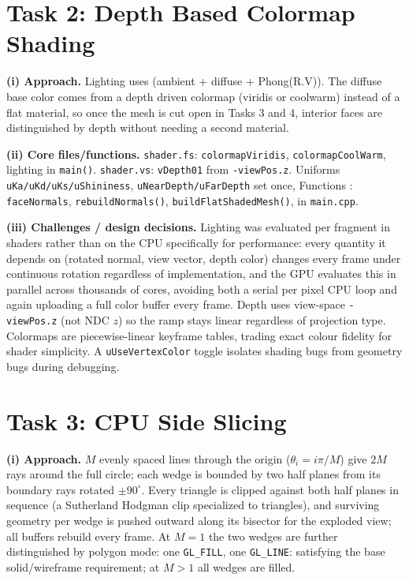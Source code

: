 \documentclass[10pt]{article}
\begin{document}
\section{Task 2: Depth Based Colormap Shading}
\textbf{(i) Approach.} Lighting uses 
(ambient + diffuse + Phong(R.V)). The 
diffuse base color comes from a depth driven colormap 
(viridis or coolwarm) instead of a flat material, so 
once the mesh is cut open in Tasks 3 and 4, interior faces 
are distinguished by depth without needing a second material.

\textbf{(ii) Core files/functions.} \texttt{shader.fs}: 
\texttt{colormapViridis}, 
\texttt{colormapCoolWarm}, 
lighting in \texttt{main()}. 
\texttt{shader.vs}: 
\texttt{vDepth01} from \texttt{-viewPos.z}. 
Uniforms \texttt{uKa/uKd/uKs/uShininess}, 
\texttt{uNearDepth/uFarDepth} set once, 
Functions : 
\texttt{faceNormals},
\texttt{rebuildNormals()},
\texttt{buildFlatShadedMesh()},
in \texttt{main.cpp}.

\textbf{(iii) Challenges / design decisions.} Lighting was evaluated 
per fragment in shaders rather than on the CPU specifically for performance: 
every quantity it depends on (rotated normal, view vector, depth color) 
changes every frame under continuous rotation regardless of implementation, 
and the GPU evaluates this in parallel across thousands of cores, 
avoiding both a serial per pixel CPU loop and again uploading a full color buffer every frame. 
Depth uses view-space
\texttt{-viewPos.z} (not NDC $z$) so the ramp stays linear regardless of projection
type. Colormaps are piecewise-linear keyframe tables, trading exact colour fidelity
for shader simplicity. A \texttt{uUseVertexColor} toggle isolates shading bugs from
geometry bugs during debugging.


\section{Task 3: CPU Side Slicing}
\textbf{(i) Approach.} $M$ evenly spaced lines through the origin ($\theta_i=i\pi/M$) 
give $2M$ rays around the full circle; each wedge is 
bounded by two half planes from its boundary rays 
rotated $\pm90^\circ$. Every triangle is clipped 
against both half planes in sequence (a Sutherland Hodgman 
clip specialized to triangles), and surviving geometry 
per wedge is pushed outward along its bisector 
for the exploded view; all buffers rebuild every 
frame. At $M=1$ the two wedges are further distinguished 
by polygon mode: one \texttt{GL\_FILL}, 
one \texttt{GL\_LINE}: satisfying the base solid/wireframe 
requirement; at $M>1$ all wedges are filled.
\end{document}
